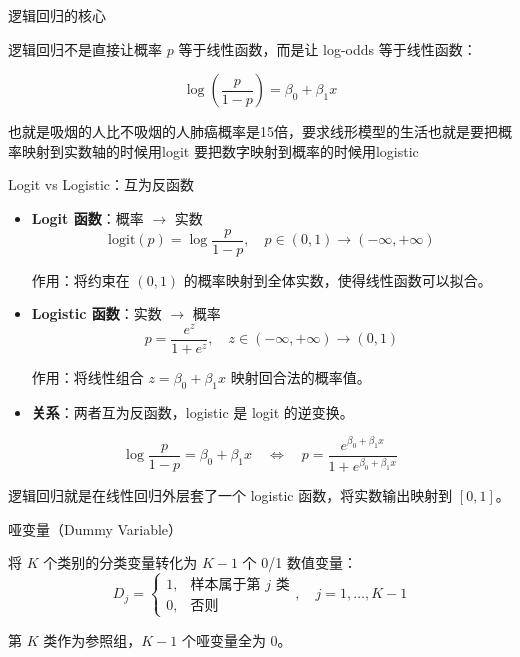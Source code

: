 \begin{note}{逻辑回归的核心}

逻辑回归不是直接让概率 $p$ 等于线性函数，而是让 log-odds 等于线性函数：

\[
\log\left(\frac{p}{1-p}\right) = \beta_0 + \beta_1 x
\]

\end{note}
\begin{dxtips}
    也就是吸烟的人比不吸烟的人肺癌概率是15倍，要求线形模型的生活也就是要把概率映射到实数轴的时候用logit 要把数字映射到概率的时候用logistic
\end{dxtips}
\begin{note}{Logit vs Logistic：互为反函数}

\begin{itemize}
    \item \textbf{Logit 函数}：概率 $\to$ 实数
    \[
    \text{logit}(p) = \log\frac{p}{1-p}, \quad p\in(0,1) \to (-\infty, +\infty)
    \]
    
    作用：将约束在 $(0,1)$ 的概率映射到全体实数，使得线性函数可以拟合。

    \item \textbf{Logistic 函数}：实数 $\to$ 概率
    \[
    p = \frac{e^z}{1+e^z}, \quad z\in(-\infty,+\infty) \to (0,1)
    \]
    
    作用：将线性组合 $z = \beta_0 + \beta_1 x$ 映射回合法的概率值。

    \item \textbf{关系}：两者互为反函数，logistic 是 logit 的逆变换。
\end{itemize}

\[
\boxed{\log\frac{p}{1-p} = \beta_0+\beta_1 x \quad\Longleftrightarrow\quad p = \frac{e^{\beta_0+\beta_1 x}}{1+e^{\beta_0+\beta_1 x}}}
\]

逻辑回归就是在线性回归外层套了一个 logistic 函数，将实数输出映射到 $[0,1]$。

\end{note}
\begin{definition}{哑变量（Dummy Variable）}

将 $K$ 个类别的分类变量转化为 $K-1$ 个 0/1 数值变量：
\[
D_j = \begin{cases}
1, & \text{样本属于第 } j \text{ 类} \\
0, & \text{否则}
\end{cases}
,\quad j = 1,\dots,K-1
\]

第 $K$ 类作为参照组，$K-1$ 个哑变量全为 $0$。

\end{definition}

